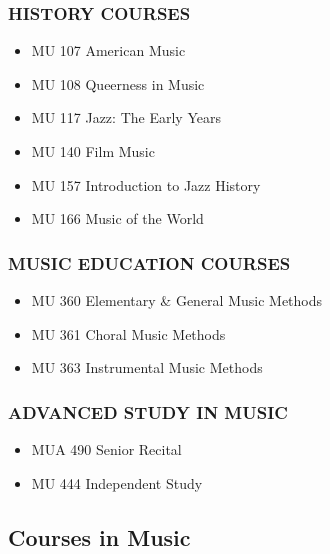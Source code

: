 \documentclass[
  letterpaper,
]{scrbook}
\providecommand{\tightlist}{%
  \setlength{\itemsep}{0pt}\setlength{\parskip}{0pt}}
\begin{document}
\subsubsection{HISTORY COURSES}\label{history-courses}

\begin{itemize}
\tightlist
\item
  MU 107 American Music\\
\item
  MU 108 Queerness in Music\\
\item
  MU 117 Jazz: The Early Years\\
\item
  MU 140 Film Music\\
\item
  MU 157 Introduction to Jazz History\\
\item
  MU 166 Music of the World
\end{itemize}

\subsubsection{MUSIC EDUCATION COURSES}\label{music-education-courses}

\begin{itemize}
\tightlist
\item
  MU 360 Elementary \& General Music Methods\\
\item
  MU 361 Choral Music Methods\\
\item
  MU 363 Instrumental Music Methods
\end{itemize}

\subsubsection{ADVANCED STUDY IN MUSIC}\label{advanced-study-in-music}

\begin{itemize}
\tightlist
\item
  MUA 490 Senior Recital\\
\item
  MU 444 Independent Study
\end{itemize}

\subsection{Courses in Music}\label{sec-courses-in-music}
\end{document}
